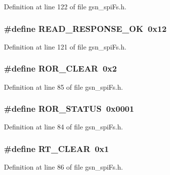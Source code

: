 Definition at line 122 of file gsn\_\-spiFs.h.

\hypertarget{a00589_abd5117f82f969dacb2121e9a48032d2d}{
\subsubsection[{READ\_\-RESPONSE\_\-OK}]{\setlength{\rightskip}{0pt plus 5cm}\#define READ\_\-RESPONSE\_\-OK~0x12}}
\label{a00589_abd5117f82f969dacb2121e9a48032d2d}


Definition at line 121 of file gsn\_\-spiFs.h.

\hypertarget{a00589_a24c449323e2955bc782cdf3b34de1e33}{
\subsubsection[{ROR\_\-CLEAR}]{\setlength{\rightskip}{0pt plus 5cm}\#define ROR\_\-CLEAR~0x2}}
\label{a00589_a24c449323e2955bc782cdf3b34de1e33}


Definition at line 85 of file gsn\_\-spiFs.h.

\hypertarget{a00589_a2b4dc619ceaead61fe74bbcf490dc15b}{
\subsubsection[{ROR\_\-STATUS}]{\setlength{\rightskip}{0pt plus 5cm}\#define ROR\_\-STATUS~0x0001}}
\label{a00589_a2b4dc619ceaead61fe74bbcf490dc15b}


Definition at line 84 of file gsn\_\-spiFs.h.

\hypertarget{a00589_aa4b1a0a251c6fac18230a25d8d89388c}{
\subsubsection[{RT\_\-CLEAR}]{\setlength{\rightskip}{0pt plus 5cm}\#define RT\_\-CLEAR~0x1}}
\label{a00589_aa4b1a0a251c6fac18230a25d8d89388c}


Definition at line 86 of file gsn\_\-spiFs.h.

